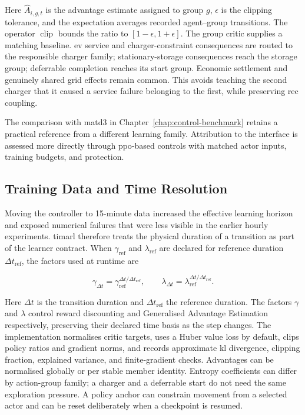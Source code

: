 Here $\hat A_{i,g,t}$ is the advantage estimate assigned to group $g$, $\epsilon$ is the clipping tolerance, and the expectation averages recorded agent--group transitions. The operator $\operatorname{clip}$ bounds the ratio to $[1-\epsilon,1+\epsilon]$. The group critic supplies a matching baseline. \gls{ev} service and charger-constraint consequences are routed to the responsible charger family; stationary-storage consequences reach the storage group; deferrable completion reaches its start group. Economic settlement and genuinely shared grid effects remain common. This avoids teaching the second charger that it caused a service failure belonging to the first, while preserving \gls{rec} coupling.

The comparison with \gls{matd3} in Chapter~\ref{chap:control-benchmark} retains a practical reference from a different learning family. Attribution to the interface is assessed more directly through \gls{ppo}-based controls with matched actor inputs, training budgets, and protection.

\subsection{Training Data and Time Resolution}
\label{sec:timarl-learning-engineering}

Moving the controller to 15-minute data increased the effective learning horizon and exposed numerical failures that were less visible in the earlier hourly experiments. \gls{timarl} therefore treats the physical duration of a transition as part of the learner contract. When $\gamma_{\mathrm{ref}}$ and $\lambda_{\mathrm{ref}}$ are declared for reference duration $\Delta t_{\mathrm{ref}}$, the factors used at runtime are

\begin{equation}
\gamma_{\Delta t}=\gamma_{\mathrm{ref}}^{\Delta t/\Delta t_{\mathrm{ref}}},
\qquad
\lambda_{\Delta t}=\lambda_{\mathrm{ref}}^{\Delta t/\Delta t_{\mathrm{ref}}}.
\label{eq:timarl-timebase}
\end{equation}

Here $\Delta t$ is the transition duration and $\Delta t_{\mathrm{ref}}$ the reference duration. The factors $\gamma$ and $\lambda$ control reward discounting and Generalised Advantage Estimation respectively, preserving their declared time basis as the step changes. The implementation normalises critic targets, uses a Huber value loss by default, clips policy ratios and gradient norms, and records approximate \gls{kl} divergence, clipping fraction, explained variance, and finite-gradient checks. Advantages can be normalised globally or per stable member identity. Entropy coefficients can differ by action-group family; a charger and a deferrable start do not need the same exploration pressure. A policy anchor can constrain movement from a selected actor and can be reset deliberately when a checkpoint is resumed.

